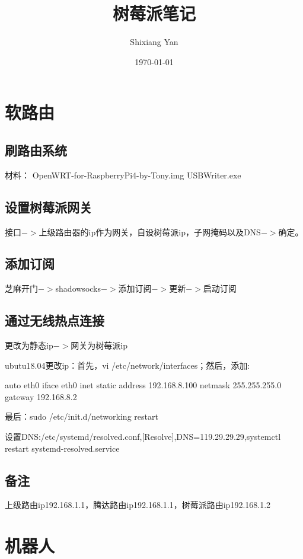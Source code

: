 \documentclass{article}
\title{树莓派笔记}
\author{Shixiang Yan}
\date{\today}
\begin{document}
	\maketitle
	\tableofcontents
	\section{软路由}
	\subsection{刷路由系统}
	材料：
	OpenWRT-for-RaspberryPi4-by-Tony.img
	USBWriter.exe
	\subsection{设置树莓派网关}
	接口$->$上级路由器的ip作为网关，自设树莓派ip，子网掩码以及DNS$->$确定。
	\subsection{添加订阅}
	芝麻开门$->$shadowsocks$->$添加订阅$->$更新$->$启动订阅
	\subsection{通过无线热点连接}
	更改为静态ip$->$网关为树莓派ip
	
	ubutu18.04更改ip：首先，vi /etc/network/interfaces；然后，添加:
	
		auto eth0
		iface eth0 inet static
		address 192.168.8.100    
		netmask 255.255.255.0
		gateway 192.168.8.2

		最后：sudo /etc/init.d/networking restart
	
	设置DNS:/etc/systemd/resolved.conf,[Resolve],DNS=119.29.29.29,systemctl restart systemd-resolved.service
	
	\subsection{备注}
	上级路由ip192.168.1.1，腾达路由ip192.168.1.1，树莓派路由ip192.168.1.2
	\section{机器人}
\end{document}
